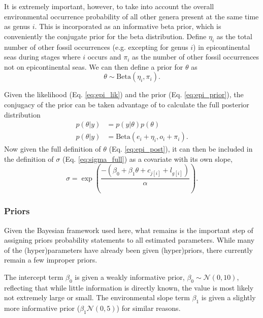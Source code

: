 \documentclass[12pt,letterpaper]{article}
\begin{document}
It is extremely important, however, to take into account the overall environmental occurrence probability of all other genera present at the same time as genus \(i\). This is incorporated as an informative beta prior, which is conveniently the conjugate prior for the beta distribution. Define \(\eta_{i}\) as the total number of other fossil occurrences (e.g. excepting for genus \(i\)) in epicontinental seas during stages where \(i\) occurs and \(\pi_{i}\) as the number of other fossil occurrences not on epicontinental seas. We can then define a prior for \(\theta\) as
\begin{equation}
  \theta \sim \mathrm{Beta}(\eta_{i}, \pi_{i}).
  \label{eq:epi_prior}
\end{equation}

Given the likelihood (Eq. \ref{eq:epi_lik}) and the prior (Eq. \ref{eq:epi_prior}), the conjugacy of the prior can be taken advantage of to calculate the full posterior distribution
\begin{equation}
  \begin{aligned}
    p(\theta | y) &= p(y | \theta) p(\theta) \\
    p(\theta | y) &= \mathrm{Beta}(e_{i} + \eta_{i}, o_{i} + \pi_{i}).
  \end{aligned}
  \label{eq:epi_post}
\end{equation}
Now given the full definition of \(\theta\) (Eq. \ref{eq:epi_post}), it can then be included in the definition of \(\sigma\) (Eq. \ref{eq:sigma_full}) as a covariate with its own slope,
\begin{equation}
  \sigma = \exp\left(\frac{-(\beta_{0} + \beta_{1}\theta + c_{j[i]} + l_{g[i]})}{\alpha}\right).
  \label{eq:sigma_updated}
\end{equation}


\subsubsection{Priors}
Given the Bayesian framework used here, what remains is the important step of assigning priors probability statements to all estimated parameters. While many of the (hyper)parameters have already been given (hyper)priors, there currently remain a few improper priors.

The intercept term \(\beta_{0}\) is given a weakly informative prior, \(\beta_{0} \sim \mathcal{N}(0, 10)\), reflecting that while little information is directly known, the value is most likely not extremely large or small. The environmental slope term \(\beta_{1}\) is given a slightly more informative prior (\(\beta_{1} \mathcal{N}(0, 5)\)) for similar reasons.
\end{document}
